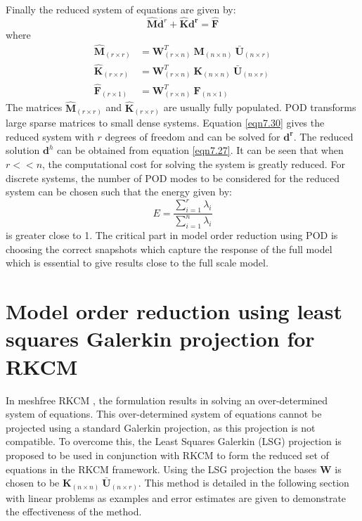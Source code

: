 \documentclass[10pt,letterpaper, onecolumn]{article}
\begin{document}
Finally the reduced system of equations are given by:
%
\begin{equation}
\hat{\bm{M}} \ddot{\bm{d}^r} + \hat{\bm{K}} \bm{d^r} = \hat{\bm{F}}
\label{eqn7.30}
\end{equation}
%
where 
%
\begin{subequations}
\begin{align}
\hat{\bm{M}}_{(r \times r)} &= \bm{W}^T_{(r \times n)} \ \bm{M}_{(n \times n)} \  \bar{\bm{U}}_{(n \times r)} \\
\hat{\bm{K}}_{(r \times r)} &= \bm{W}^T_{(r \times n)} \ \bm{K}_{(n \times n)} \  \bar{\bm{U}}_{(n \times r)} \\
\hat{\bm{F}}_{(r \times 1)} &= \bm{W}^T_{(r \times n)} \ \bm{F}_{(n \times 1)}
\end{align}
\end{subequations}
%
The matrices $\hat{\bm{M}}_{(r \times r)}$ and $\hat{\bm{K}}_{(r \times r)}$ are usually fully populated. POD transforms large sparse matrices to small dense systems. Equation \eqref{eqn7.30} gives the reduced system with $r$ degrees of freedom and can be solved for $\bm{d^r}$. The reduced solution $\bm{d}^h$ can be obtained from equation \eqref{eqn7.27}. It can be seen that when $r << n$, the computational cost for solving the system is greatly reduced. For discrete systems, the number of POD modes to be considered for the reduced system can be chosen such that the energy given by:
%
\begin{equation}
E = \frac{\sum^r_{i=1}\lambda_i}{\sum^n_{i=1}\lambda_i}
\end{equation}
%
is greater close to 1. The critical part in model order reduction using POD is choosing the correct snapshots which capture the response of the full model which is essential to give results close to the full scale model.

\section{Model order reduction using least squares Galerkin projection for RKCM}

In meshfree RKCM \cite{hu2011error}, the formulation results in solving an over-determined system of equations. This over-determined system of equations cannot be projected using a standard Galerkin projection, as this projection is not compatible. To overcome this, the Least Squares Galerkin (LSG) projection is proposed to be used in conjunction with RKCM to form the reduced set of equations in the RKCM framework. Using the LSG projection the bases $\bm{W}$ is chosen to be $\bm{K}_{(n \times n)} \  \bar{\bm{U}}_{(n \times r)}$. This method is detailed in the following section with linear problems as examples and error estimates are given to demonstrate the effectiveness of the method.
\end{document}
